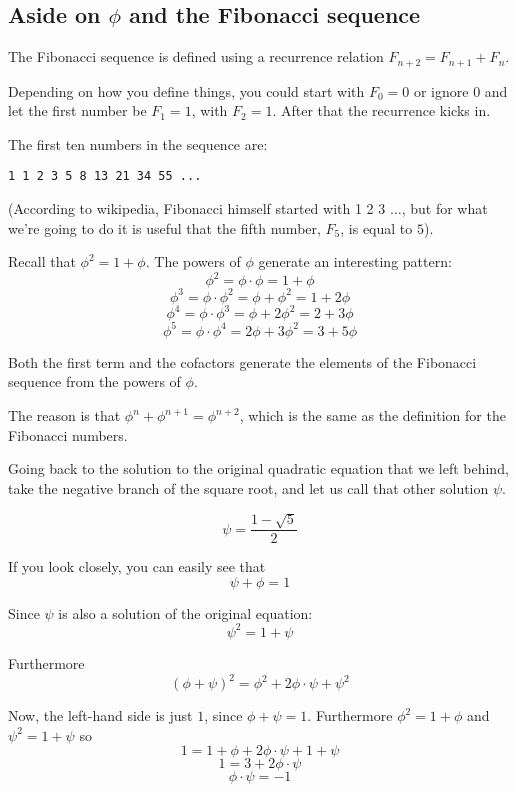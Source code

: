 \documentclass[11pt, oneside]{article}
\begin{document}
\subsection*{Aside on $\phi$ and the Fibonacci sequence}

The Fibonacci sequence is defined using a recurrence relation $F_{n+2} = F_{n+1} + F_n$.

Depending on how you define things, you could start with $F_0 = 0$ or ignore $0$ and let the first number be $F_1 = 1$, with $F_2 = 1$.  After that the recurrence kicks in.

The first ten numbers in the sequence are:
\begin{verbatim}
1 1 2 3 5 8 13 21 34 55 ...
\end{verbatim}

(According to wikipedia, Fibonacci himself started with 1 2 3 $\dots$, but for what we're going to do it is useful that the fifth number, $F_5$, is equal to $5$).

Recall that $\phi^2 = 1 + \phi$.  The powers of $\phi$ generate an interesting pattern:
\[ \phi^2 = \phi \cdot \phi = 1 + \phi \]
\[ \phi^3 = \phi \cdot \phi^2 = \phi + \phi^2 = 1 + 2 \phi \]
\[ \phi^4 = \phi \cdot \phi^3 = \phi + 2 \phi^2 = 2 + 3 \phi \]
\[ \phi^5 = \phi \cdot \phi^4 = 2 \phi + 3 \phi^2 = 3 + 5 \phi \]

Both the first term and the cofactors generate the elements of the Fibonacci sequence from the powers of $\phi$.

The reason is that $\phi^n + \phi^{n+1} = \phi^{n+2}$, which is the same as the definition for the Fibonacci numbers.

Going back to the solution to the original quadratic equation that we left behind, take the negative branch of the square root, and let us call that other solution $\psi$.

\[ \psi = \frac{1 - \sqrt{5}}{2} \]

If you look closely, you can easily see that
\[ \psi + \phi = 1 \]

Since $\psi$ is also a solution of the original equation:
\[ \psi^2 = 1 + \psi \]

Furthermore
\[ (\phi + \psi)^2 = \phi^2 + 2 \phi \cdot \psi + \psi^2 \]

Now, the left-hand side is just $1$, since $\phi + \psi = 1$.  Furthermore $\phi^2 = 1 + \phi$ and $\psi^2 = 1 + \psi$ so
\[ 1 = 1 + \phi + 2 \phi \cdot \psi + 1 + \psi \]
\[ 1 = 3 + 2  \phi \cdot \psi  \]
\[ \phi \cdot \psi = -1 \]
\end{document}
